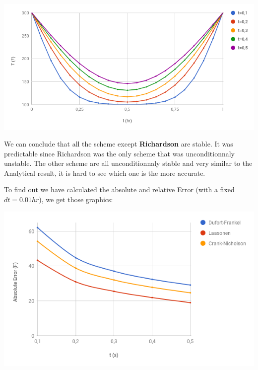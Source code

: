 \documentclass [10 pt, a4 paper]{article}
\begin{document}
\begin{center} 
    \includegraphics[scale=0.5]{Chart/crankNicholson.PNG}
\end{center}
 
We can conclude that all the scheme except \textbf{Richardson} are stable.
It was predictable since Richardson was the only scheme that was unconditionnaly
unstable. The other scheme are all unconditionnaly stable and very similar to the Analytical
result, it is hard to see which one is the more accurate.

To find out we have calculated the absolute and relative Error (with a fixed $dt = 0.01hr$), we get those graphics:

\begin{center} 
    \includegraphics[scale=0.5]{Chart/AbsoluteError.PNG}
\end{center}
\end{document}
